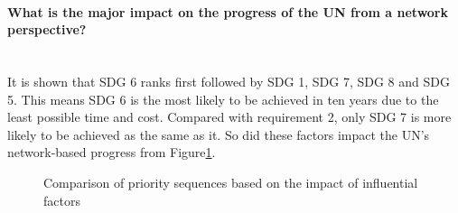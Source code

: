 \documentclass[10pt]{mcmthesis}
\newcommand{\subsubsubsection}[1]{\paragraph{#1}\mbox{}\\}
\begin{document}

 



\subsubsubsection{What is the major impact on the progress of the UN from a network perspective?}
\indent It is shown that SDG 6 ranks first followed by SDG 1, SDG 7, SDG 8 and SDG 5. This means SDG 6 is the most likely to be achieved in ten years due to the least possible time and cost. Compared with requirement 2, only SDG 7 is more likely to be achieved as the same as it. So did these factors impact the UN's network-based progress from Figure\ref{Pareto Front}.
\begin{figure}[H]
    \centering
    
    
    \caption{ Comparison of priority sequences based on the impact of influential factors  }%
    \label{Pareto Front}
\end{figure}
\end{document}

